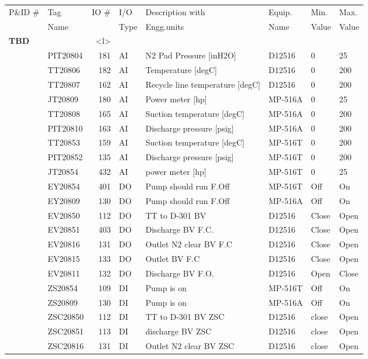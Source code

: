 \documentclass[a4paper,oneside]{article}
\begin{document}
\begin{center}
\begin{tabular}{llrlllll}
P\&ID \# & Tag & IO \# & I/O & Description with & Equip. & Min. & Max.\\
 & Name &  & Type & Engg.units & Name & Value & Value\\
\textbf{TBD} &  & <l> &  &  &  &  & \\
\hline
 & PIT20804 & 181 & AI & N2 Pad Pressure [inH2O] & D12516 & 0 & 25\\
 & TT20806 & 182 & AI & Temperature [degC] & D12516 & 0 & 200\\
 & TT20807 & 162 & AI & Recycle line temperature [degC] & D12516 & 0 & 200\\
 & JT20809 & 180 & AI & Power meter [hp] & MP-516A & 0 & 25\\
 & TT20808 & 165 & AI & Suction temperature [degC] & MP-516A & 0 & 200\\
 & PIT20810 & 163 & AI & Discharge pressure [psig] & MP-516A & 0 & 200\\
 & TT20853 & 159 & AI & Suction temperature [degC] & MP-516T & 0 & 200\\
 & PIT20852 & 135 & AI & Discharge pressure [psig] & MP-516T & 0 & 200\\
 & JT20854 & 432 & AI & power meter [hp] & MP-516T & 0 & 25\\
 & EY20854 & 401 & DO & Pump should run F.Off & MP-516T & Off & On\\
 & EY20809 & 130 & DO & Pump should run F.Off & MP-516A & Off & On\\
 & EV20850 & 112 & DO & TT to D-301 BV & D12516 & Close & Open\\
 & EV20851 & 403 & DO & Discharge BV F.C. & D12516 & Close & Open\\
 & EV20816 & 131 & DO & Outlet N2 clear BV F.C & D12516 & Close & Open\\
 & EV20815 & 133 & DO & Outlet BV F.C & D12516 & Close & Open\\
 & EV20811 & 132 & DO & Discharge BV F.O. & D12516 & Open & Close\\
 & ZS20854 & 109 & DI & Pump is on & MP-516T & Off & On\\
 & ZS20809 & 130 & DI & Pump is on & MP-516A & Off & On\\
 & ZSC20850 & 112 & DI & TT to D-301 BV ZSC & D12516 & close & Open\\
 & ZSC20851 & 113 & DI & discharge BV ZSC & D12516 & close & Open\\
 & ZSC20816 & 131 & DI & Outlet N2 clear BV ZSC & D12516 & close & Open\\

\end{tabular}
\end{center}
\end{document}
